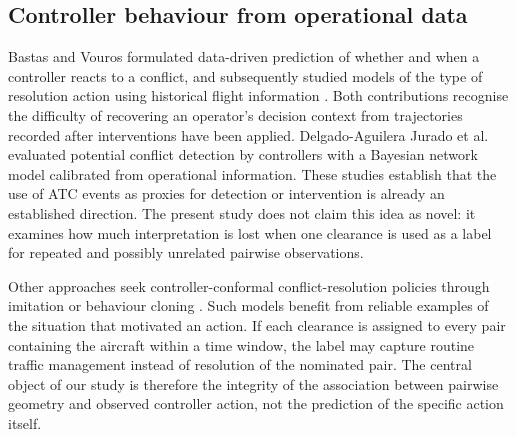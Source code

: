 \documentclass[pdflatex,sn-mathphys-num]{sn-jnl}
\begin{document}
\subsection{Controller behaviour from operational data}
Bastas and Vouros \cite{bastas2022} formulated data-driven prediction of whether and when a controller reacts to a conflict, and subsequently studied models of the type of resolution action using historical flight information \cite{bastas2023}. Both contributions recognise the difficulty of recovering an operator's decision context from trajectories recorded after interventions have been applied. Delgado-Aguilera Jurado et al. \cite{delgado2022} evaluated potential conflict detection by controllers with a Bayesian network model calibrated from operational information. These studies establish that the use of ATC events as proxies for detection or intervention is already an established direction. The present study does not claim this idea as novel: it examines how much interpretation is lost when one clearance is used as a label for repeated and possibly unrelated pairwise observations.

Other approaches seek controller-conformal conflict-resolution policies through imitation or behaviour cloning \cite{guleria2024}. Such models benefit from reliable examples of the situation that motivated an action. If each clearance is assigned to every pair containing the aircraft within a time window, the label may capture routine traffic management instead of resolution of the nominated pair. The central object of our study is therefore the integrity of the association between pairwise geometry and observed controller action, not the prediction of the specific action itself.
\end{document}
